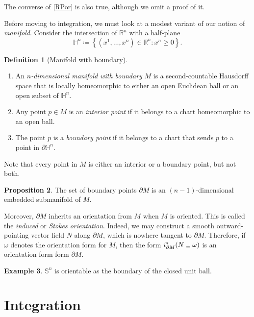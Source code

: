 \documentclass[10pt,letterpaper,cm]{nupset}
\theoremstyle{definition}
\newtheorem{definition}{Definition}[subsection]
\newtheorem{exmp}[definition]{Example}
\theoremstyle{theorem}
\newtheorem{prop}[definition]{Proposition}
\theoremstyle{remark}
\renewcommand{\H}{\mathbb H}
\newcommand{\R}{\mathbb R}
\renewcommand{\S}{\mathbb S}
\newcommand{\1}{\mathbf{1}}
\newcommand{\0}{\vec 0}
\newcommand{\intprodl}{%
    \mathbin{\scalebox{1.5}{$\lrcorner$}}%
}
\begin{document}
The converse of \cref{RPor} is also true, although we omit a proof of it.

\bigskip



Before moving to integration, we must look at a modest variant of our notion of \textit{manifold}. Consider the intersection of $\R^n$ with a half-plane 
$$\H^n\coloneqq  \left\{\left(x^1, \ldots, x^n\right) \in \R^n : x^n \geq 0\right\}.$$


\begin{definition}[Manifold with boundary] $ $
\begin{enumerate}
\item An \textit{$n$-dimensional manifold with boundary} $M$ is a second-countable Hausdorff space that is locally homeomorphic to either an open Euclidean ball or an open subset of $\H^n$. 
\item Any point $p\in M$ is an \textit{interior point} if it belongs to a chart homeomorphic to an open ball. 
\item The  point $p$ is  a \textit{boundary point} if it belongs to a chart that sends $p$ to a point in $\partial{\H^n}$.
\end{enumerate}
\end{definition}


Note that every point in $M$ is either an interior or a boundary point, but not both.


\begin{prop}
The set of boundary points $\partial{M}$ is an $(n-1)$-dimensional embedded submanifold of $M$.
\end{prop}


Moreover, $\partial{M}$ inherits an orientation from $M$ when $M$ is oriented. This is called the \textit{induced} or \textit{Stokes orientation}. Indeed, we may construct a smooth  outward-pointing vector field $N$ along $\partial{M}$, which is nowhere tangent to $\partial{M}$. Therefore,  if $\omega$ denotes the orientation form for $M$, then the form $i^{\ast}_{\partial{M}}(N \intprodl \omega)$ is an orientation form form $\partial{M}$.


\begin{exmp}
$\S^n$ is orientable as the boundary of the closed unit ball.
\end{exmp}

\section{Integration}
\end{document}
